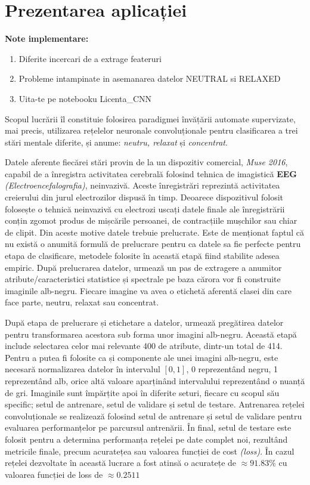 \chapter{Prezentarea aplicației}\label{ch:3implementare}

\textbf{Note implementare:}
\begin{enumerate}
\item Diferite incercari de a extrage feateruri
\item Probleme intampinate in asemanarea datelor NEUTRAL si RELAXED
\item Uita-te pe notebooku Licenta\_CNN
\end{enumerate}

Scopul lucrării îl constituie folosirea paradigmei învățării automate supervizate, mai precis, utilizarea rețelelor neuronale convoluționale pentru clasificarea a trei stări mentale diferite, și anume: \textit{neutru, relaxat} și \textit{concentrat}. 

Datele aferente fiecărei stări provin de la un dispozitiv comercial, \textit{Muse 2016}, capabil de a înregistra activitatea cerebrală folosind tehnica de imagistică \textbf{EEG} \textit{(Electroencefalografia)}, neinvazivă. Aceste înregistrări reprezintă activitatea creierului din jurul electrozilor dispusă în timp. Deoarece dispozitivul folosit folosește o tehnică neinvazivă cu electrozi uscați datele finale ale înregistrării conțin zgomot produs de mișcările persoanei, de contracțiile mușchilor sau chiar de clipit. Din aceste motive datele trebuie prelucrate. Este de menționat faptul că nu există o anumită formulă de prelucrare pentru ca datele sa fie perfecte pentru etapa de clasificare, metodele folosite în această etapă fiind stabilite adesea empiric. După prelucrarea datelor, urmează un pas de extragere a anumitor atribute/caracteristici statistice și spectrale pe baza cărora vor fi construite imaginile alb-negru. Fiecare imagine va avea o etichetă aferentă clasei din care face parte, neutru, relaxat sau concentrat.

După etapa de prelucrare și etichetare a datelor, urmează pregătirea datelor pentru transformarea acestora sub forma unor imagini alb-negru. Această etapă include selectarea celor mai relevante 400 de atribute, dintr-un total de 414. Pentru a putea fi folosite ca și componente ale unei imagini alb-negru, este necesară normalizarea datelor în intervalul $[0,1]$, 0 reprezentând negru, 1 reprezentând alb, orice altă valoare aparținând intervalului reprezentând o nuanță de gri. Imaginile sunt împărțite apoi în diferite seturi, fiecare cu scopul său specific; setul de antrenare, setul de validare și setul de testare. Antrenarea rețelei convoluționale se realizează folosind setul de antrenare și setul de validare pentru evaluarea performanțelor pe parcursul antrenării. În final, setul de testare este folosit pentru a determina performanța rețelei pe date complet noi, rezultând metricile finale, precum acuratețea sau valoarea funcției de cost \textit{(loss)}. În cazul rețelei dezvoltate în această lucrare a fost atinsă o acuratețe de $\approx91.83\%$ cu valoarea funcției de loss de $\approx0.2511$

